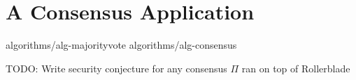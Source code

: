 \section{A Consensus Application}\label{sec:consensus}

{algorithms/alg-majorityvote}
{algorithms/alg-consensus}

\begin{conjecture}[Security]
  TODO: Write security conjecture for any consensus $\Pi$ ran on top of Rollerblade
\end{conjecture}

%
